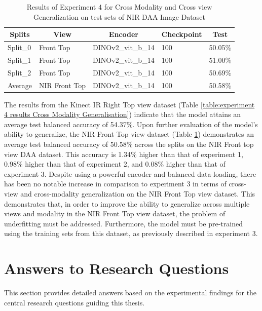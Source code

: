 \begin{table}[htbp]
\caption{Results of Experiment 4 for Cross Modality and Cross view Generalization on test sets of NIR DAA Image Dataset}
\label{table:experiment 4 results Cross Modality and view Generalisation on NIR}
\centering
\begin{tabular}{lllll}
\multicolumn{1}{c}{\textbf{Splits}} & \multicolumn{1}{c}{\textbf{View}} & \multicolumn{1}{c}{\textbf{Encoder}} & \multicolumn{1}{c}{\textbf{Checkpoint}} & \multicolumn{1}{c}{\textbf{Test}}\\
\hline
Split\_0 & Front Top & DINOv2\_vit\_b\_14 & 100 & 50.05\% \\
Split\_1 & Front Top & DINOv2\_vit\_b\_14 & 100 & 51.00\% \\
Split\_2 & Front Top & DINOv2\_vit\_b\_14 & 100 & 50.69\% \\
\hline
Average & NIR Front Top & DINOv2\_vit\_b\_14 & 100 & 50.58\% \\
\hline
\end{tabular}
\end{table}
The results from the Kinect IR Right Top view dataset (Table \ref{table:experiment 4 results Cross Modality Generalisation}) indicate that the model attains an average test balanced accuracy of 54.37\%. 
Upon further evaluation of the model's ability to generalize, the NIR Front Top view dataset (Table \ref{table:experiment 4 results Cross Modality and view Generalisation on NIR}) demonstrates an average test balanced accuracy of 50.58\% across the splits on the NIR Front top view DAA dataset. This accuracy is 1.34\% higher than that of experiment 1, 0.98\% higher than that of experiment 2, and 0.08\% higher than that of experiment 3. Despite using a powerful encoder and balanced data-loading, there has been no notable increase in comparison to experiment 3 in terms of cross-view and cross-modality generalization on the NIR Front Top view dataset. This demonstrates that, in order to improve the ability to generalize across multiple views and modality in the NIR Front Top view dataset, the problem of underfitting must be addressed. Furthermore, the model must be pre-trained using the training sets from this dataset, as previously described in experiment 3.

\section{Answers to Research Questions}
\label{section:answers_to_research_questions}
This section provides detailed answers based on the experimental findings for the central research questions guiding this thesis.

